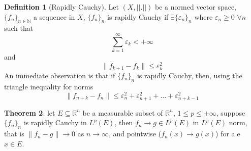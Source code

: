 \documentclass[13pt]{article}
\theoremstyle{definition} --- default
\newtheorem{theorem}{Theorem}
\theoremstyle{definition}
\newtheorem{definition}[theorem]{Definition}
\theoremstyle{remark}
\begin{document}
	\begin{definition}[Rapidly Cauchy]
		Let $(X,||.||)$ be a normed vector space, $\{f_n\}_{n \in \mathbb{N}}$ a sequence in $X$, $\{f_n\}_n$ is rapidly Cauchy if $\exists \{\varepsilon_{n}\}_n$ where $\varepsilon_n \geq 0$ $\forall n$ such that 
		$$ \sum_{k=1}^\infty \varepsilon_k < +\infty$$
		and
		$$ \| f_{k+1} - f_k \| \leq \varepsilon_k^2 $$
		An immediate observation is that if $\{f_n\}_n$ is rapidly Cauchy, then, using the triangle inequality for norms
		$$
		\|f_{n+k} - f_n \| \leq \varepsilon^2_n + \varepsilon^2_{n+1} + \ldots + \varepsilon^2_{n+k-1}
		$$

	\end{definition}
	\begin{theorem}
		\label{thm:lpeconv}
		let $E \subseteq \mathbb{R}^n$ be a measurable subset of $\mathbb{R}^n$, $1 \leq p \leq +\infty$, suppose $\{f_n\}_n$ is rapidly Cauchy in $L^p(E)$, then $f_n \to g \in L^p(E)$ in $L^p(E)$ norm, that is $\| f_n - g \| \to 0$ as $n \to \infty$, and pointwise ($f_n(x) \to g(x)$) for a.e $x \in E$. 
	\end{theorem}
\end{document}
